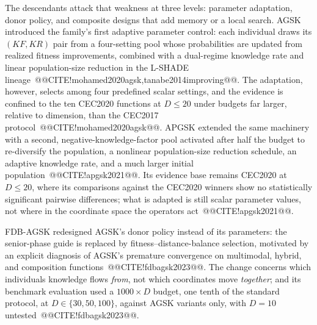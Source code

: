\documentclass[10pt,a4paper]{article}
\newcommand{\agsk}{AGSK}
\newcommand{\apgsk}{APGSK}
\newcommand{\fdbagsk}{FDB-AGSK}
\begin{document}
The descendants attack that weakness at three levels: parameter
adaptation, donor policy, and composite designs that add memory or a
local search. \agsk{} introduced the family's first adaptive parameter
control: each individual draws its $(KF, KR)$ pair from a
four-setting pool whose probabilities are updated from realized fitness
improvements, combined with a dual-regime knowledge rate and linear
population-size reduction in the L-SHADE
lineage~@@CITE!mohamed2020agsk,tanabe2014improving@@. 
The adaptation, however, selects among four predefined scalar settings,
and the evidence is confined to the ten CEC2020 functions at
$D \leq 20$ under budgets far larger, relative to dimension, than the
CEC2017 protocol~@@CITE!mohamed2020agsk@@. 
\apgsk{} extended the same machinery with a second,
negative-knowledge-factor pool activated after half the budget to
re-diversify the population, a nonlinear population-size reduction
schedule, an adaptive knowledge rate, and a much larger initial
population~@@CITE!apgsk2021@@. 
Its evidence base remains CEC2020 at $D \leq 20$, where its comparisons
against the CEC2020 winners show no statistically significant pairwise
differences; what is adapted is still scalar parameter values, not where
in the coordinate space the operators
act~@@CITE!apgsk2021@@. 

\fdbagsk{} redesigned \agsk{}'s donor policy instead of its parameters:
the senior-phase guide is replaced by fitness--distance-balance
selection, motivated by an explicit diagnosis of \agsk{}'s premature
convergence on multimodal, hybrid, and composition
functions~@@CITE!fdbagsk2023@@. 
The change concerns which individuals knowledge flows \emph{from}, not
which coordinates move \emph{together}; and its benchmark evaluation
used a $1000 \times D$ budget, one tenth of the standard protocol,
at $D \in \{30, 50, 100\}$, against \agsk{} variants only, with $D = 10$
untested~@@CITE!fdbagsk2023@@. 
\end{document}
